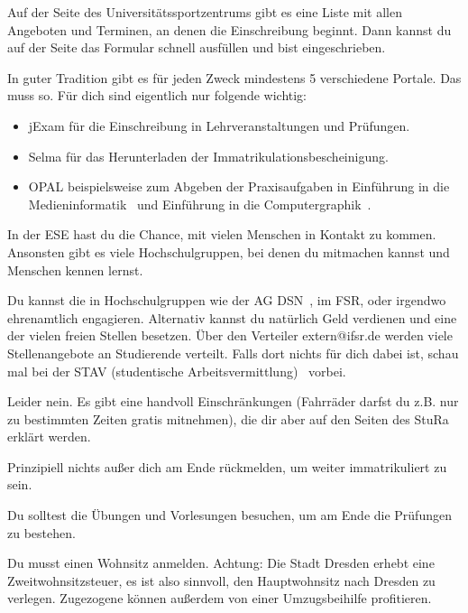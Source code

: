 Auf der Seite des Universitätssportzentrums gibt es eine Liste mit allen Angeboten und Terminen, an denen die Einschreibung beginnt. Dann kannst du auf der Seite das Formular schnell ausfüllen und bist eingeschrieben.

In guter Tradition gibt es für jeden Zweck mindestens 5 verschiedene Portale. Das muss so. Für dich sind eigentlich nur folgende wichtig:
\begin{itemize}
\item jExam für die Einschreibung in Lehrveranstaltungen und Prüfungen.
\item Selma für das Herunterladen der Immatrikulationsbescheinigung.
\item OPAL beispielsweise zum Abgeben der Praxisaufgaben in Einführung in die Medieninformatik~ und Einführung in die Computergraphik~.
\end{itemize}

In der ESE hast du die Chance, mit vielen Menschen in Kontakt zu kommen. Ansonsten gibt es viele Hochschulgruppen, bei denen du mitmachen kannst und Menschen kennen lernst.

Du kannst die in Hochschulgruppen wie der AG DSN~, im FSR, oder irgendwo ehrenamtlich engagieren. Alternativ kannst du natürlich Geld verdienen und eine der vielen freien Stellen besetzen. Über den Verteiler extern@ifsr.de werden viele Stellenangebote an Studierende verteilt. Falls dort nichts für dich dabei ist, schau mal bei der STAV (studentische Arbeitsvermittlung)~ vorbei.

Leider nein. Es gibt eine handvoll Einschränkungen (Fahrräder darfst du z.B. nur zu bestimmten Zeiten gratis mitnehmen), die dir aber auf den Seiten des StuRa~ erklärt werden.

Prinzipiell nichts außer dich am Ende rückmelden, um weiter immatrikuliert zu sein.

Du solltest die Übungen und Vorlesungen besuchen, um am Ende die Prüfungen zu bestehen.

Du musst einen Wohnsitz anmelden. Achtung: Die Stadt Dresden erhebt eine Zweitwohnsitzsteuer, es ist also sinnvoll, den Hauptwohnsitz nach Dresden zu verlegen. Zugezogene können außerdem von einer Umzugsbeihilfe profitieren.

